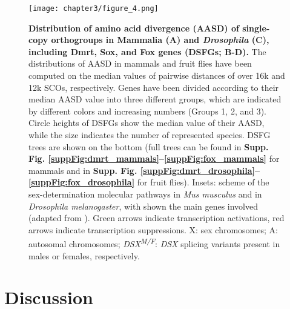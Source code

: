 \documentclass[../main.tex]{subfiles}
\begin{document}
\begin{figure}
	\centering
	\texttt{[image: chapter3/figure\_4.png]}
	\captionsetup{width=\textwidth}
	\caption{
		\textbf{Distribution of amino acid divergence (AASD) of single-copy orthogroups in Mammalia (A) and \textit{Drosophila} (C), including Dmrt, Sox, and Fox genes (DSFGs; B-D).} The distributions of AASD in mammals and fruit flies have been computed on the median values of pairwise distances of over 16k and 12k SCOs, respectively. Genes have been divided according to their median AASD value into three different groups, which are indicated by different colors and increasing numbers (Groups 1, 2, and 3). Circle heights of DSFGs show the median value of their AASD, while the size indicates the number of represented species. DSFG trees are shown on the bottom (full trees can be found in \textbf{Supp. Fig. \ref{suppFig:dmrt_mammals}--\ref{suppFig:fox_mammals}} for mammals and in \textbf{Supp. Fig. \ref{suppFig:dmrt_drosophila}--\ref{suppFig:fox_drosophila}} for fruit flies). Insets: scheme of the sex-determination molecular pathways in \textit{Mus musculus} and in \textit{Drosophila melanogaster}, with shown the main genes involved (adapted from \textbf{\cite{beukeboom2014evolution}}). Green arrows indicate transcription activations, red arrows indicate transcription suppressions. X: sex chromosomes; A: autosomal chromosomes; \textit{DSX\textsuperscript{M/F}}: \textit{DSX} splicing variants present in males or females, respectively.
	}
	\label{fig:DSFG_testDivergence}
\end{figure}

\section{Discussion} \label{chpater3_discussion}
\end{document}

